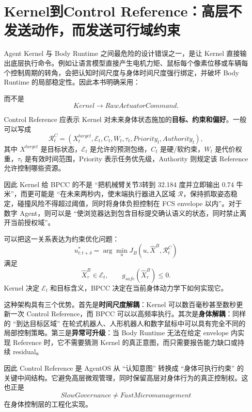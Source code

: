 \section{Kernel到Control Reference：高层不发送动作，而发送可行域约束}

Agent Kernel 与 Body Runtime 之间最危险的设计错误之一，是让 Kernel 直接输出底层执行命令。例如让语言模型直接产生电机力矩、鼠标每个像素位移或车辆每个控制周期的转角，会把认知时间尺度与身体时间尺度强行绑定，并破坏 Body Runtime 的局部稳定性。因此本书明确采用：
\begin{statementbox}
\centering
{}
\end{statementbox}
而不是
\[
Kernel
\rightarrow
RawActuatorCommand .
\]

Control Reference 应表示 Kernel 对未来身体状态施加的\textbf{目标、约束和偏好}。一般可以写成
\[
\mathcal R^C_t
=
\left(
X^{target}_t,
\mathcal E_t,
C_t,
W_t,
\tau_t,
Priority_t,
Authority_t
\right),
\]
其中 $X^{target}$ 是目标状态，$\mathcal E_t$ 是允许的预测包络，$C_t$ 是硬/软约束，$W_t$ 是代价权重，$\tau_t$ 是有效时间范围，Priority 表示任务优先级，Authority 则规定该 Reference 允许控制哪些资源。

因此 Kernel 给 BPCC 的不是 ``把机械臂关节3转到 32.184 度并立即输出 0.74 牛米''，而更可能是 ``在未来两秒内，使末端执行器进入区域 $\mathcal R$，保持抓取姿态稳定，碰撞风险不得超过阈值，同时将身体负担控制在 FCS envelope 以内''。对于数字 Agent，则可以是 ``使浏览器达到包含目标提交确认语义的状态，同时禁止离开当前授权域''。

可以把这一关系表达为约束优化问题：
\[
u^*_{t:t+\delta}
=
\arg\min_u
J_B
\left(
u,
\hat X^B,
\mathcal R^C_t
\right)
\]
满足
\[
\hat X^B_{\tau}
\in
\mathcal E_t,
\qquad
g_{safe}(\hat X^B_\tau)\leq0.
\]
Kernel 决定 $\mathcal E_t$ 和目标含义，BPCC 决定在当前身体动力学下如何实现它。

这种架构具有三个优势。首先是\textbf{时间尺度解耦}：Kernel 可以数百毫秒甚至数秒更新一次 Control Reference，而 BPCC 可以以高频率执行。其次是\textbf{身体解耦}：同样的 ``到达目标区域'' 在轮式机器人、人形机器人和数字鼠标中可以具有完全不同的局部控制策略。第三是\textbf{异常可升级}：当 Body Runtime 无法在给定 envelope 内实现 Reference 时，它不需要猜测 Kernel 的真正意图，而只需要报告能力缺口或持续 residual。

因此 Control Reference 是 AgentOS 从 ``认知意图'' 转换成 ``身体可执行约束'' 的关键中间结构。它避免高层微观管理，同时保留高层对身体行为的真正控制权。这也正是
\[
\boxed{
SlowGovernance\neq FastMicromanagement
}
\]
在身体控制层的工程化实现。


